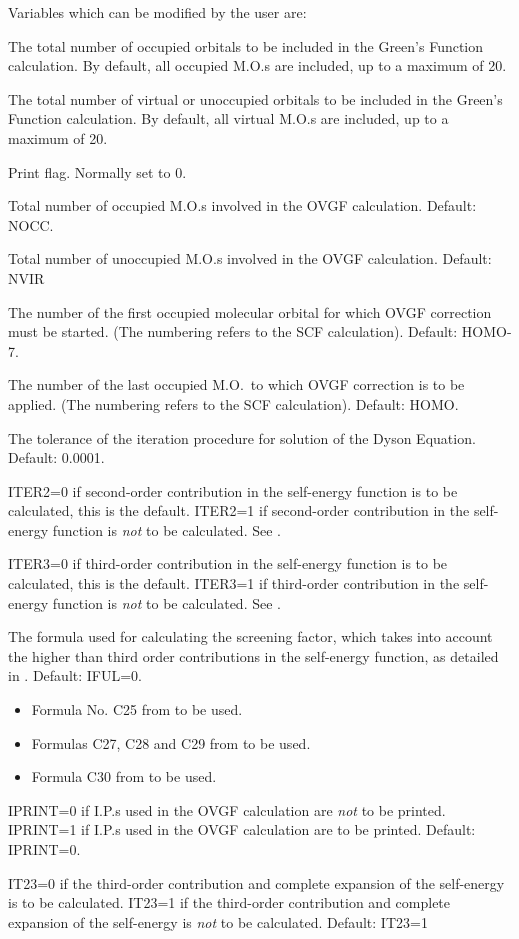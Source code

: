 Variables which can be modified by the user are:
\begin{description}
\item{} The total number of occupied orbitals to be included in the Green's
Function calculation.  By default, all occupied M.O.s are included, up to a maximum
of 20.
\item{} The total number of virtual or unoccupied  orbitals to be included
in the Green's Function calculation.  By default, all virtual M.O.s are
included, up to a maximum of 20.
\item{} Print flag.  Normally set to 0.
\item{} Total number of occupied M.O.s involved in the OVGF calculation.
Default: NOCC.
\item{} Total number of unoccupied M.O.s involved in the OVGF calculation.
Default: NVIR
\item{} The number of the first occupied molecular orbital for which
OVGF correction must be started.  (The numbering refers to the SCF calculation). Default: HOMO-7.
\item{} The number of the last occupied M.O.\ to which OVGF correction is
to be applied. (The numbering refers to the SCF calculation). Default: HOMO.
\item{} The tolerance of the iteration procedure for solution of the
Dyson Equation.  Default: 0.0001.
\item{} ITER2=0 if second-order contribution in the self-energy function is to
be calculated, this is the default. ITER2=1 if second-order contribution in the
self-energy function is {\em not} to be calculated.
See \cite{gf1,gf2,gf3,gf4,gf5,gf6}.
\item{} ITER3=0 if third-order contribution in the self-energy function is to
be calculated, this is the default. ITER3=1 if third-order contribution in the
self-energy function is {\em not} to be calculated.
See \cite{gf1,gf2,gf3,gf4,gf5,gf6}.
\item{} The formula used for calculating the screening factor, which takes
into account the higher than third order contributions in the self-energy function,
as detailed in \cite{gf2}. Default: IFUL=0.
\begin{itemize}
\item{} Formula No. C25 from \cite{gf2} to be used.
\item{} Formulas C27, C28 and C29 from \cite{gf2} to be used.
\item{} Formula C30 from \cite{gf2} to be used.
\end{itemize}
\item{} IPRINT=0 if I.P.s used in the OVGF calculation are {\em not}
to be printed. IPRINT=1 if I.P.s used in the OVGF calculation are
to be printed. Default: IPRINT=0.
\item{} IT23=0 if the third-order contribution and complete expansion
of the self-energy is to be calculated.  IT23=1 if the third-order contribution and
complete expansion of the self-energy is {\em not} to be calculated. Default: IT23=1
\end{description}


